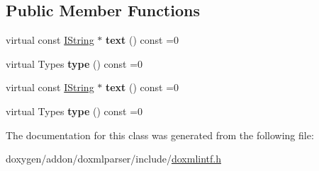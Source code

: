 \subsection*{Public Member Functions}
\begin{DoxyCompactItemize}
\item 
\mbox{\label{class_i_doc_verbatim_a399f4250969671b14252294579423dc8}} 
virtual const \mbox{\hyperlink{class_i_string}{I\+String}} $\ast$ {\bfseries text} () const =0
\item 
\mbox{\label{class_i_doc_verbatim_a6366c6a67ea4d42bc336a80fdc2cc1a0}} 
virtual Types {\bfseries type} () const =0
\item 
\mbox{\label{class_i_doc_verbatim_a399f4250969671b14252294579423dc8}} 
virtual const \mbox{\hyperlink{class_i_string}{I\+String}} $\ast$ {\bfseries text} () const =0
\item 
\mbox{\label{class_i_doc_verbatim_a6366c6a67ea4d42bc336a80fdc2cc1a0}} 
virtual Types {\bfseries type} () const =0
\end{DoxyCompactItemize}


The documentation for this class was generated from the following file\+:\begin{DoxyCompactItemize}
\item 
doxygen/addon/doxmlparser/include/\mbox{\hyperlink{include_2doxmlintf_8h}{doxmlintf.\+h}}\end{DoxyCompactItemize}
